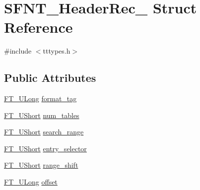 \hypertarget{struct_s_f_n_t___header_rec__}{\section{S\-F\-N\-T\-\_\-\-Header\-Rec\-\_\- Struct Reference}
\label{struct_s_f_n_t___header_rec__}
}


{\ttfamily \#include $<$tttypes.\-h$>$}

\subsection*{Public Attributes}
\begin{DoxyCompactItemize}
\item 
\hyperlink{fttypes_8h_a4fac88bdba78eb76b505efa6e4fbf3f5}{F\-T\-\_\-\-U\-Long} \hyperlink{struct_s_f_n_t___header_rec___ad59d649b189ab19fae02341e95e02448}{format\-\_\-tag}
\item 
\hyperlink{fttypes_8h_a937f6c17cf5ffd09086d8610c37b9f58}{F\-T\-\_\-\-U\-Short} \hyperlink{struct_s_f_n_t___header_rec___a46d8d8bf8f2d8b6536eb5fa5704852e2}{num\-\_\-tables}
\item 
\hyperlink{fttypes_8h_a937f6c17cf5ffd09086d8610c37b9f58}{F\-T\-\_\-\-U\-Short} \hyperlink{struct_s_f_n_t___header_rec___a39ca0e21eaec6be602547bb2ed898d5d}{search\-\_\-range}
\item 
\hyperlink{fttypes_8h_a937f6c17cf5ffd09086d8610c37b9f58}{F\-T\-\_\-\-U\-Short} \hyperlink{struct_s_f_n_t___header_rec___ada628a85486eb034abd56b872ecdcd78}{entry\-\_\-selector}
\item 
\hyperlink{fttypes_8h_a937f6c17cf5ffd09086d8610c37b9f58}{F\-T\-\_\-\-U\-Short} \hyperlink{struct_s_f_n_t___header_rec___aa2a39db194a8a9a0cc8504143ac4f5c1}{range\-\_\-shift}
\item 
\hyperlink{fttypes_8h_a4fac88bdba78eb76b505efa6e4fbf3f5}{F\-T\-\_\-\-U\-Long} \hyperlink{struct_s_f_n_t___header_rec___a04f99ce2ff335f8702a4edf7132a3e04}{offset}
\end{DoxyCompactItemize}


